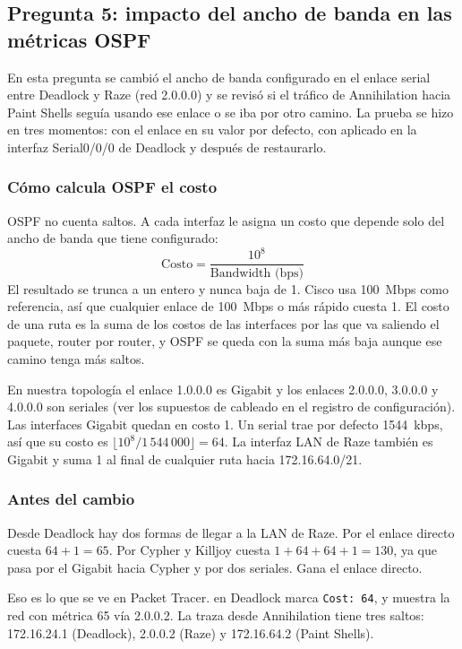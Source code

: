 \subsection{Pregunta 5: impacto del ancho de banda en las métricas OSPF}

En esta pregunta se cambió el ancho de banda configurado en el enlace serial entre Deadlock y Raze (red 2.0.0.0) y se revisó si el tráfico de Annihilation hacia Paint Shells seguía usando ese enlace o se iba por otro camino. La prueba se hizo en tres momentos: con el enlace en su valor por defecto, con  aplicado en la interfaz Serial0/0/0 de Deadlock y después de restaurarlo.

\subsubsection*{Cómo calcula OSPF el costo}

OSPF no cuenta saltos. A cada interfaz le asigna un costo que depende solo del ancho de banda que tiene configurado:
\[
  \text{Costo} = \frac{10^{8}}{\text{Bandwidth (bps)}}
\]
El resultado se trunca a un entero y nunca baja de 1. Cisco usa 100~Mbps como referencia, así que cualquier enlace de 100~Mbps o más rápido cuesta 1. El costo de una ruta es la suma de los costos de las interfaces por las que va saliendo el paquete, router por router, y OSPF se queda con la suma más baja aunque ese camino tenga más saltos.

En nuestra topología el enlace 1.0.0.0 es Gigabit y los enlaces 2.0.0.0, 3.0.0.0 y 4.0.0.0 son seriales (ver los supuestos de cableado en el registro de configuración). Las interfaces Gigabit quedan en costo 1. Un serial trae por defecto 1544~kbps, así que su costo es $\lfloor 10^{8} / 1\,544\,000 \rfloor = 64$. La interfaz LAN de Raze también es Gigabit y suma 1 al final de cualquier ruta hacia 172.16.64.0/21.

\subsubsection*{Antes del cambio}

Desde Deadlock hay dos formas de llegar a la LAN de Raze. Por el enlace directo cuesta $64 + 1 = 65$. Por Cypher y Killjoy cuesta $1 + 64 + 64 + 1 = 130$, ya que pasa por el Gigabit hacia Cypher y por dos seriales. Gana el enlace directo.

Eso es lo que se ve en Packet Tracer.  en Deadlock marca \texttt{Cost: 64}, y  muestra la red con métrica 65 vía 2.0.0.2. La traza desde Annihilation tiene tres saltos: 172.16.24.1 (Deadlock), 2.0.0.2 (Raze) y 172.16.64.2 (Paint Shells).

